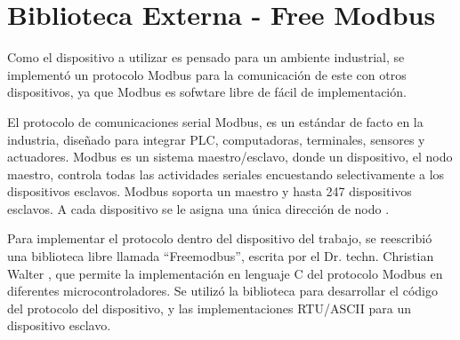 \section{ Biblioteca Externa - Free Modbus}
\label{sec:cap2parte6}

Como el dispositivo a utilizar es pensado para un ambiente industrial, se implementó un protocolo Modbus para la comunicación de este con otros dispositivos, ya que Modbus es sofwtare libre de fácil de implementación.

El protocolo de comunicaciones serial Modbus, es un estándar de facto en la industria, diseñado para integrar PLC, computadoras, terminales, sensores y actuadores. Modbus es un sistema maestro/esclavo, donde un dispositivo, el nodo maestro, controla todas las actividades seriales encuestando selectivamente a los dispositivos esclavos. Modbus soporta un maestro y hasta 247 dispositivos esclavos. A cada dispositivo se le asigna una única dirección de nodo \cite{drury2001control}.

Para implementar el protocolo dentro del dispositivo del trabajo, se reescribió una biblioteca libre llamada \textquotedblleft Freemodbus\textquotedblright , escrita por el Dr. techn. Christian Walter \cite{freegithubb}, que permite la implementación en lenguaje C del protocolo Modbus en diferentes microcontroladores. Se utilizó la biblioteca para desarrollar el código del protocolo del dispositivo, y las implementaciones RTU/ASCII para un dispositivo esclavo.








